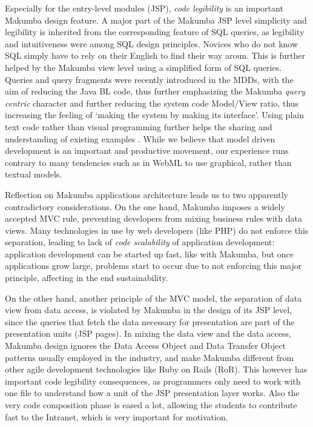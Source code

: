 \documentclass{chi2009}
\begin{document}
Especially for the entry-level modules (JSP), \textit{code legibility} is an important Makumba design feature.
A major part of the Makumba JSP level simplicity and legibility is inherited from the corresponding feature of SQL queries, as legibility and intuitiveness were among SQL design principles. Novices who do not know SQL simply have to rely on their English to find their way aroun. This is further helped by the Makumba view level using a simplified form of SQL queries. Queries and query fragments were recently introduced in the MDDs, with the aim of reducing the Java BL code, thus further emphasizing the Makumba \textit{query centric} character and further reducing the system code Model/View ratio, thus increasing the feeling of `making the system by making its interface'. Using plain text code rather than visual programming further helps the sharing and understanding of existing examples \cite{yamauchi00}. While we believe that model driven development is an important and productive movement, our experience runs contrary to many tendencies such as in WebML \cite{Ceri00webmodeling} to use graphical, rather than textual models.

Reflection on Makumba applications architecture leads us to two apparently contradictory considerations. On the one hand, Makumba imposes a widely accepted MVC rule, preventing developers from mixing business rules with data views. Many technologies in use by web developers (like PHP) do not enforce this separation, leading to lack of \textit{code scalability} of application development: application development can be started up fast, like with Makumba, but once applications grow large, problems start to occur due to not enforcing this major principle, affecting in the end sustainability. %

On the other hand, another principle of the MVC model, the separation of
data view from data access,
is violated by Makumba in the design of its JSP level,
since the queries that fetch the data necessary for presentation are part of the presentation units (JSP pages). %
In mixing the data view and the data access, Makumba design ignores the Data Access Object and Data Transfer Object patterns usually employed in the industry, and make Makumba different from other agile development technologies like Ruby on Rails (RoR). This however has important code legibility consequences, as programmers only need to work with one file to understand how a unit of the JSP presentation layer works. Also the very code composition phase is eased a lot, allowing the students to contribute fast to the Intranet, which is very important for motivation. 
\end{document}
